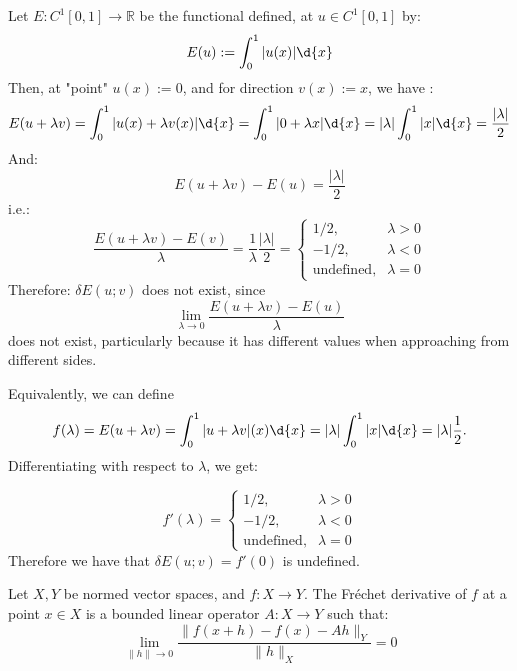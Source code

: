\documentclass{article}
\begin{document}
\begin{example} Let $E: C^{1}[0,1] \to \mathbb{R}$ be the functional defined, at $u \in C^{1}[0,1]$ by:
\[
  E(u) := \int_{0}^{1} |u(x)| \d{x}
\]
  Then, at "point" $u(x) := 0$, and for direction $v(x) := x$, we have :
\[
  E(u+\lambda v) = \int_{0}^{1} |u(x) + \lambda v(x)| \d{x} = \int_{0}^{1} |0 + \lambda x| \d{x} = | \lambda | \int_{0}^{1} |x| \d{x} = \frac{ | \lambda| }{2}
\]
And:
\[
  E(u+\lambda v) - E(u) = \frac{ | \lambda| }{2}
\]
i.e.:
\[
  \frac{E (u + \lambda v) - E(v) }{\lambda} =   \frac{1}{\lambda} \frac{| \lambda |}{2} = \begin{cases} 1/2, & \lambda > 0 \\ -1/2, & \lambda < 0 \\ \text{undefined}, & \lambda = 0 \end{cases} 
\]
Therefore:
$\delta E(u ; v)$ does not exist, since 
 \[
   \lim_{\lambda \to 0} \frac{E(u + \lambda v)-E(u)}{ \lambda} 
 \]
  does not exist, particularly because it has different values when   approaching from different sides. 

Equivalently, we can define
\[
  f (\lambda) = E(u + \lambda v) = \int_{0}^{1} | u + \lambda v |(x)  \d{x} = | \lambda |
  \int_{0}^{1} | x | \d{x} = | \lambda | \frac{1}{2}. 
\] 
Differentiating with respect to $\lambda$, we get:

\[
  f'(\lambda) =  \begin{cases} 1/2, & \lambda >0 \\ -1/2,  & \lambda < 0 \\ \text{undefined}, & \lambda = 0  \end{cases} 
\]
  Therefore we have that $\delta E (u ; v) = f'(0)$ is undefined. 
\end{example}

\begin{definition} Let $X,Y$ be normed vector spaces, and $f: X \to Y$. The Fréchet derivative of $f$ at a point $x \in X$ is a bounded linear operator $A: X \to Y$ such that:
\[
  \lim_{\lVert h \rVert \to 0} \frac{ \lVert f(x+h) - f(x) - Ah \rVert_Y  }{ \lVert h \rVert_X  } = 0
\]
 \end{definition}
\end{document}
